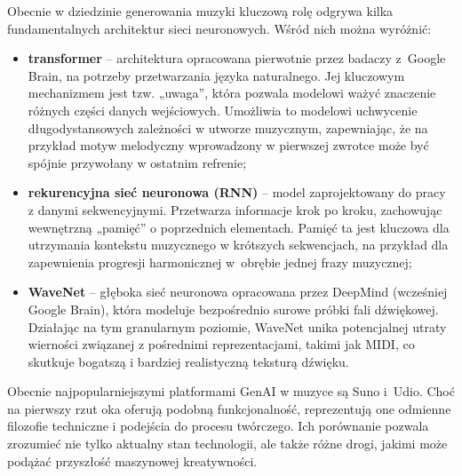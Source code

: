 Obecnie w dziedzinie generowania muzyki kluczową rolę odgrywa kilka fundamentalnych architektur sieci neuronowych\cite{vaswani2017all}. Wśród nich można wyróżnić:
\begin{itemize}
    \item \textbf{transformer} -- architektura opracowana pierwotnie przez badaczy z~Google Brain, na potrzeby przetwarzania języka naturalnego. Jej kluczowym mechanizmem jest tzw. „uwaga”, która pozwala modelowi ważyć znaczenie różnych części danych wejściowych. Umożliwia to modelowi uchwycenie długodystansowych zależności w utworze muzycznym, zapewniając, że na przykład motyw melodyczny wprowadzony w pierwszej zwrotce może być spójnie przywołany w ostatnim refrenie;
    \item \textbf{rekurencyjna sieć neuronowa (RNN)} -- model zaprojektowany do pracy z danymi sekwencyjnymi. Przetwarza informacje krok po kroku, zachowując wewnętrzną „pamięć” o poprzednich elementach. Pamięć ta jest kluczowa dla utrzymania kontekstu muzycznego w krótszych sekwencjach, na przykład dla zapewnienia progresji harmonicznej w~obrębie jednej frazy muzycznej;
    \item \textbf{WaveNet} -- głęboka sieć neuronowa opracowana przez DeepMind (wcześniej Google Brain), która modeluje bezpośrednio surowe próbki fali dźwiękowej. Działając na tym granularnym poziomie, WaveNet unika potencjalnej utraty wierności związanej z pośrednimi reprezentacjami, takimi jak MIDI, co skutkuje bogatszą i bardziej realistyczną teksturą dźwięku.
\end{itemize}

Obecnie najpopularniejszymi platformami GenAI w muzyce są Suno i~Udio. Choć na pierwszy rzut oka oferują podobną funkcjonalność, reprezentują one odmienne filozofie techniczne i podejścia do procesu twórczego. Ich porównanie pozwala zrozumieć nie tylko aktualny stan technologii, ale także różne drogi, jakimi może podążać przyszłość maszynowej kreatywności\cite{ventura1999quantum}.

